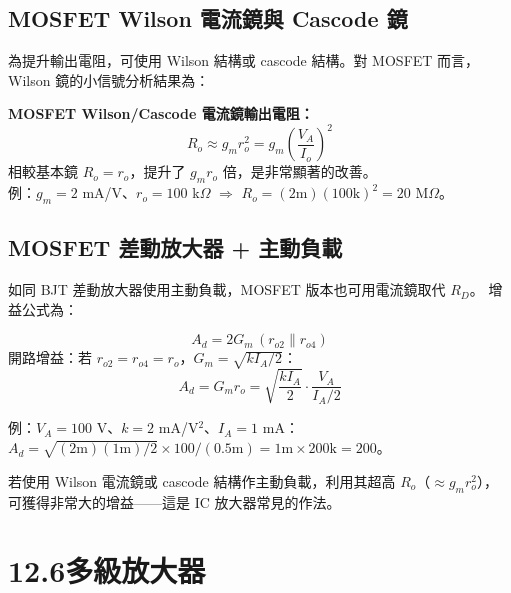 \documentclass[12pt]{article}
\begin{document}
\subsection*{MOSFET Wilson 電流鏡與 Cascode 鏡}


為提升輸出電阻，可使用 Wilson 結構或 cascode 結構。對 MOSFET 而言，
Wilson 鏡的小信號分析結果為：

\begin{formulabox}
\textbf{MOSFET Wilson/Cascode 電流鏡輸出電阻：}
\[
  R_o \approx g_m r_o^2 = g_m \left(\frac{V_A}{I_o}\right)^2 \tag{12.49}
\]
相較基本鏡 $R_o = r_o$，提升了 $g_m r_o$ 倍，是非常顯著的改善。\\
例：$g_m = 2$ mA/V、$r_o = 100$ k$\Omega$ $\Rightarrow$ $R_o = (2\text{m})(100\text{k})^2 = 20$ M$\Omega$。
\end{formulabox}

\subsection*{MOSFET 差動放大器 + 主動負載}


\begin{keybox}
如同 BJT 差動放大器使用主動負載，MOSFET 版本也可用電流鏡取代 $R_D$。
增益公式為：
\begin{formulabox}
\[
  A_d = 2G_m\,(r_{o2} \| r_{o4}) \tag{12.50}
\]
開路增益：若 $r_{o2} = r_{o4} = r_o$，$G_m = \sqrt{kI_A/2}$：
\[
  A_d = G_m r_o = \sqrt{\frac{kI_A}{2}}\cdot\frac{V_A}{I_A/2} \tag{12.52}
\]
\end{formulabox}

例：$V_A = 100$ V、$k = 2$ mA/V$^2$、$I_A = 1$ mA：
$A_d = \sqrt{(2\text{m})(1\text{m})/2} \times 100/(0.5\text{m}) = 1\text{m} \times 200\text{k} = 200$。

\medskip
若使用 Wilson 電流鏡或 cascode 結構作主動負載，利用其超高 $R_o$（$\approx g_m r_o^2$），
可獲得非常大的增益——這是 IC 放大器常見的作法。
\end{keybox}

\section*{12.6\quad 多級放大器}
\end{document}
